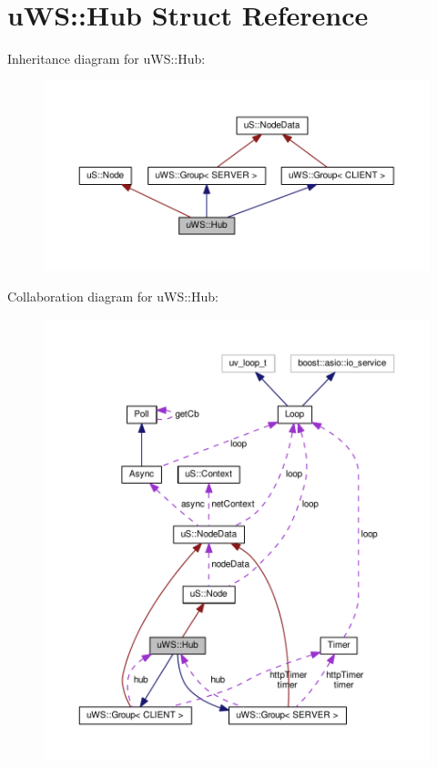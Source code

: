 \hypertarget{structu_w_s_1_1_hub}{}\section{u\+WS\+:\+:Hub Struct Reference}
\label{structu_w_s_1_1_hub}


Inheritance diagram for u\+WS\+:\+:Hub\+:
\nopagebreak
\begin{figure}[H]
\begin{center}
\leavevmode
\includegraphics[width=350pt]{structu_w_s_1_1_hub__inherit__graph}
\end{center}
\end{figure}


Collaboration diagram for u\+WS\+:\+:Hub\+:
\nopagebreak
\begin{figure}[H]
\begin{center}
\leavevmode
\includegraphics[width=350pt]{structu_w_s_1_1_hub__coll__graph}
\end{center}
\end{figure}
